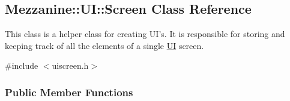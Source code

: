 \hypertarget{classMezzanine_1_1UI_1_1Screen}{
\subsection{Mezzanine::UI::Screen Class Reference}
\label{classMezzanine_1_1UI_1_1Screen}
}


This class is a helper class for creating UI's. It is responsible for storing and keeping track of all the elements of a single \hyperlink{namespaceMezzanine_1_1UI}{UI} screen.  




{\ttfamily \#include $<$uiscreen.h$>$}

\subsubsection*{Public Member Functions}
